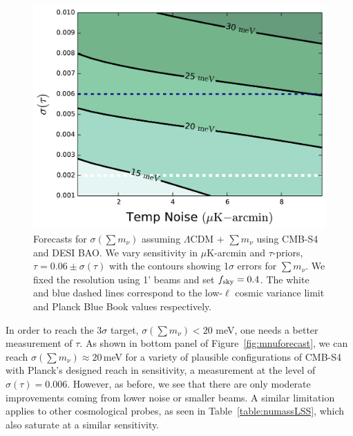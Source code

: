 \begin{figure}[h!]
\begin{center}
\includegraphics[scale=0.6]{Neutrinos/Mnu_tauprior.pdf}

\caption{ Forecasts for $\sigma(\sum m_\nu)$ assuming $\Lambda$CDM + $\sum m_\nu$ using CMB-S4 and DESI BAO.  We vary sensitivity in $\mu$K-arcmin and $\tau$-priors, $\tau = 0.06 \pm \sigma(\tau)$ with the contours showing 1$\sigma$ errors for $\sum m_\nu$.  We fixed the resolution using 1' beams and set $f_{\rm sky} =0.4$.  The white and blue dashed lines correspond to the low-$\ell$ cosmic variance limit and Planck Blue Book values respectively. }
\label{fig:mnu_tau}
\end{center}
\end{figure} 

In order to reach the 3$\sigma$ target, $\sigma(\sum m_\nu) < 20$ meV,
one needs a better measurement of $\tau$.
As shown in bottom panel of Figure~\ref{fig:mnuforecast},
we can reach $\sigma(\sum m_\nu) \approx 20$\,meV for a variety of plausible
configurations of CMB-S4 with Planck's designed reach in sensitivity, a
measurement at the level of $\sigma(\tau) = 0.006$.
 However, as before, we see that there are only moderate improvements coming from lower noise or smaller beams.  A similar limitation applies to other cosmological probes, as seen in Table~\ref{table:numassLSS}, which also saturate at a similar sensitivity.

